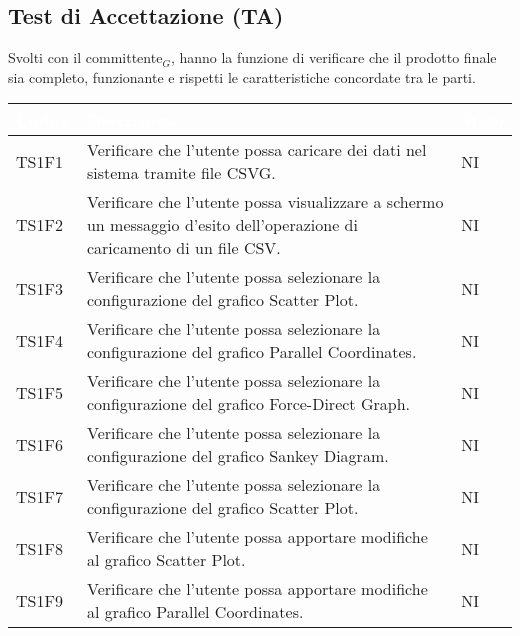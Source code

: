     \subsection{Test di Accettazione (TA)} Svolti con il committente$_G$, hanno la funzione di verificare che il prodotto
        finale sia completo, funzionante e rispetti le caratteristiche concordate tra le parti.
        \begin{center}
            \renewcommand\arraystretch{1.5}
            \centering
            \begin{longtable}{|p{1.5cm}|p{11cm}|p{1cm}|}
            \hline
            \rowcolor[HTML]{036400}
            \textcolor{white}{\textbf{Codice}} & \textcolor{white}{\textbf{Descrizione}} & \textcolor{white}{\textbf{Stato}} \\ \hline
                \rowcolor[HTML]{EFEFEF}
                TS1F1 & Verificare che l’utente possa caricare dei dati nel sistema tramite file CSVG. & NI\\ \hline
                \rowcolor[HTML]{C0C0C0}
                TS1F2 & Verificare che l’utente possa visualizzare a schermo un messaggio d’esito dell’operazione di caricamento di un file CSV.& NI\\ \hline
                \rowcolor[HTML]{EFEFEF}
                TS1F3 & Verificare che l’utente possa selezionare la configurazione del grafico Scatter Plot. & NI\\ \hline
                \rowcolor[HTML]{C0C0C0}
                TS1F4 & Verificare che l’utente possa selezionare la configurazione del grafico Parallel Coordinates. & NI\\ \hline
                \rowcolor[HTML]{EFEFEF}
                TS1F5 & Verificare che l’utente possa selezionare la configurazione del grafico Force-Direct Graph. & NI\\ \hline
                \rowcolor[HTML]{C0C0C0}
                TS1F6 & Verificare che l’utente possa selezionare la configurazione del grafico Sankey Diagram. & NI\\ \hline
                \rowcolor[HTML]{EFEFEF}
                TS1F7 & Verificare che l’utente possa selezionare la configurazione del grafico Scatter Plot. & NI\\ \hline
                \rowcolor[HTML]{C0C0C0}
                TS1F8 & Verificare che l’utente possa apportare modifiche al grafico Scatter Plot. & NI\\ \hline
                \rowcolor[HTML]{EFEFEF}
                TS1F9 & Verificare che l’utente possa apportare modifiche al grafico Parallel Coordinates. & NI\\ \hline

\end{longtable}
\end{center}

